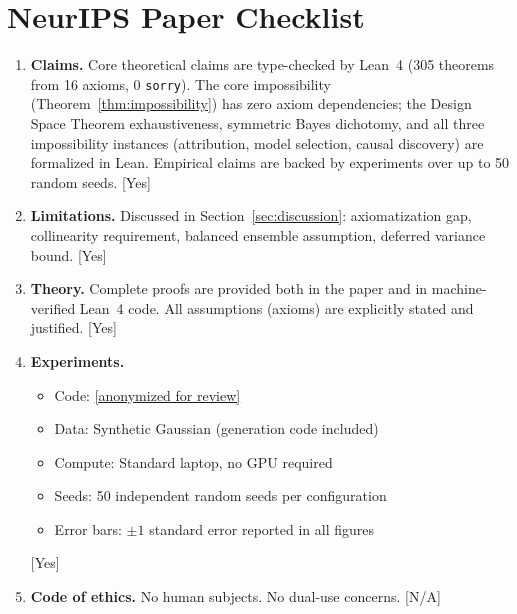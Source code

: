 \documentclass{article}
\begin{document}



\newpage
\section*{NeurIPS Paper Checklist}

\begin{enumerate}
\item \textbf{Claims.} Core theoretical claims are type-checked by Lean~4 (305 theorems from 16 axioms, 0 \texttt{sorry}). The core impossibility (Theorem~\ref{thm:impossibility}) has zero axiom dependencies; the Design Space Theorem exhaustiveness, symmetric Bayes dichotomy, and all three impossibility instances (attribution, model selection, causal discovery) are formalized in Lean. Empirical claims are backed by experiments over up to 50 random seeds. [Yes]

\item \textbf{Limitations.} Discussed in Section~\ref{sec:discussion}: axiomatization gap, collinearity requirement, balanced ensemble assumption, deferred variance bound. [Yes]

\item \textbf{Theory.} Complete proofs are provided both in the paper and in machine-verified Lean~4 code. All assumptions (axioms) are explicitly stated and justified. [Yes]

\item \textbf{Experiments.}
  \begin{itemize}
    \item Code: \url{[anonymized for review]}
    \item Data: Synthetic Gaussian (generation code included)
    \item Compute: Standard laptop, no GPU required
    \item Seeds: 50 independent random seeds per configuration
    \item Error bars: $\pm 1$ standard error reported in all figures
  \end{itemize}
  [Yes]

\item \textbf{Code of ethics.} No human subjects. No dual-use concerns. [N/A]
\end{enumerate}
\end{document}
